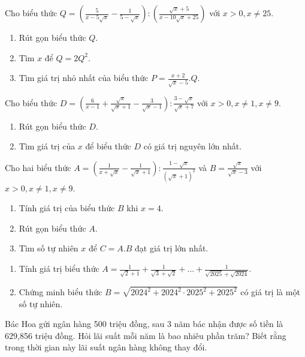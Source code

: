 \documentclass[%
    fontsize=12pt,%
    chapterprefix=false,%
    open=right,%
    twoside=false,%
    numbers=noenddot,%
    headings=optiontohead,%
    final,%
    DIV=15,%
    parskip=half %
]{scrbook}
\begin{document}
\begin{tuluan}
\item Cho biểu thức $ Q = \left( \frac{5}{x - 5\sqrt{x}} - \frac{1}{5 - \sqrt{x}} \right) : \left( \frac{\sqrt{x} + 5}{x - 10\sqrt{x} + 25} \right) $ với $ x > 0, x \neq 25 $.
\begin{enumerate}[label=\alph*)]
  \item[a)] Rút gọn biểu thức $ Q $.
  \item[b)] Tìm $ x $ để $ Q = 2Q^2 $.
  \item[c)] Tìm giá trị nhỏ nhất của biểu thức $ P = \frac{x + 2}{\sqrt{x} - 5} . Q $.
\end{enumerate}

\item Cho biểu thức $ D = \left( \frac{6}{x - 1} + \frac{\sqrt{x}}{\sqrt{x} + 1} - \frac{3}{\sqrt{x} - 1} \right) : \frac{3 - \sqrt{x}}{\sqrt{x} + 7} $ với $ x > 0, x \neq 1, x \neq 9 $.
\begin{enumerate}[label=\alph*)]
  \item[a)] Rút gọn biểu thức $ D $.
  \item[b)] Tìm giá trị của $ x $ để biểu thức $ D $ có giá trị nguyên lớn nhất.
\end{enumerate}

\item Cho hai biểu thức $ A = \left( \frac{1}{x + \sqrt{x}} - \frac{1}{\sqrt{x} + 1} \right) : \frac{1 - \sqrt{x}}{(\sqrt{x} + 1)^2} $ và $ B = \frac{\sqrt{x}}{\sqrt{x} - 3} $ với $ x > 0, x \neq 1, x \neq 9 $.
\begin{enumerate}[label=\alph*)]
  \item[a)] Tính giá trị của biểu thức $ B $ khi $ x = 4 $.
  \item[b)] Rút gọn biểu thức $ A $.
  \item[c)] Tìm số tự nhiên $ x $ để $ C = A.B $ đạt giá trị lớn nhất.
\end{enumerate}

\item \begin{enumerate}[label=\alph*)]
  \item[a)] Tính giá trị biểu thức $ A = \frac{1}{\sqrt{2} + 1} + \frac{1}{\sqrt{3} + \sqrt{2}} + ... + \frac{1}{\sqrt{2025} + \sqrt{2024}} $.
  \item[b)] Chứng minh biểu thức $ B = \sqrt{2024^2 + 2024^2 \cdot 2025^2 + 2025^2} $ có giá trị là một số tự nhiên.
\end{enumerate}

\item Bác Hoa gửi ngân hàng 500 triệu đồng, sau 3 năm bác nhận được số tiền là 629,856 triệu đồng. Hỏi lãi suất mỗi năm là bao nhiêu phần trăm? Biết rằng trong thời gian này lãi suất ngân hàng không thay đổi.


\end{tuluan}
\end{document}
